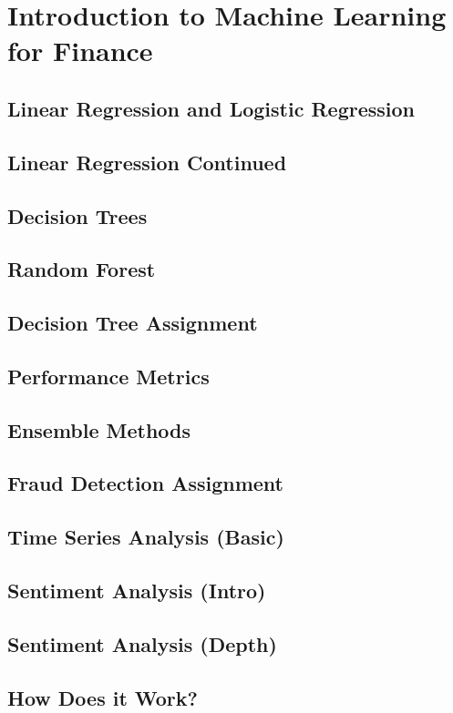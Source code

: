 \documentclass[12pt,openany]{book}
\begin{document}
\chapter{Introduction to Machine Learning for Finance}
\section{Linear Regression and Logistic Regression}
\section{Linear Regression Continued}
\section{Decision Trees}
\section{Random Forest}
\section{Decision Tree Assignment}
\section{Performance Metrics}
\section{Ensemble Methods}
\section{Fraud Detection Assignment}
\section{Time Series Analysis (Basic)}
\section{Sentiment Analysis (Intro)}
\section{Sentiment Analysis (Depth)}
\section{How Does it Work?}
\end{document}
